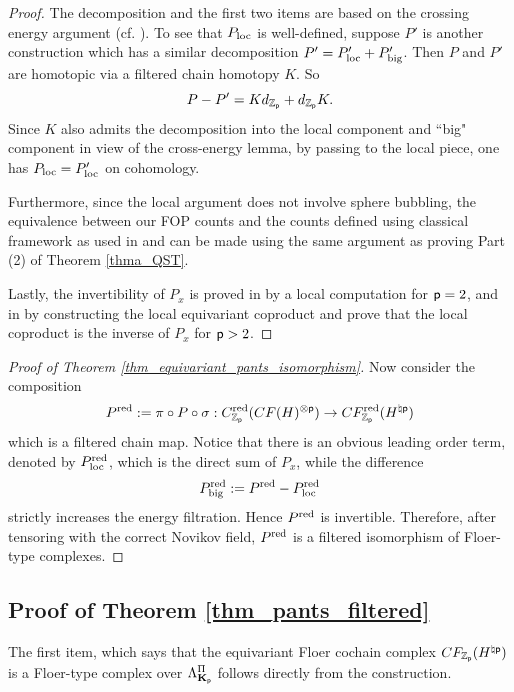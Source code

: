 \documentclass[reqno, 10pt]{amsart}
\numberwithin{equation}{section}
\numberwithin{equation}{section}
\theoremstyle{definition}
\theoremstyle{remark}
\newcommand{\beqn}{\begin{equation*}}
\newcommand{\eeqn}{\end{equation*}}
\newcommand{\mb}{\mathbb}
\newcommand{\p}{{\sf p}}
\newcommand{\kp}{{\bf K}_{\sf p}}
\newcommand{\zp}{{{\mb Z}_{\sf p}}}
\begin{document}
\begin{proof}
The decomposition and the first two items are based on the crossing energy argument (cf. \cite[Lemma B.1]{BSWX}). To see that $P_{\rm loc}$ is well-defined, suppose $P'$ is another construction which has a similar decomposition $P' = P_{\rm loc}' + P_{\rm big}'$. Then $P$ and $P'$ are homotopic via a filtered chain homotopy $K$. So 
\beqn
P - P' = K d_{\zp} + d_{\zp} K.
\eeqn
Since $K$ also admits the decomposition into the local component and ``big" component in view of the cross-energy lemma, by passing to the local piece, one has $P_{\rm loc} = P_{\rm loc}'$ on cohomology. 

Furthermore, since the local argument does not involve sphere bubbling, the equivalence between our FOP counts and the counts defined using classical framework as used in \cite{Seidel_pants} and \cite{shelukhin-zhao} can be made using the same argument as proving Part (2) of Theorem \ref{thma_QST}.

Lastly, the invertibility of $P_x$ is proved in \cite{Seidel_pants} by a local computation for $\p = 2$, and in \cite{shelukhin-zhao} by constructing the local equivariant coproduct and prove that the local coproduct is the inverse of $P_x$ for $\p > 2$.
\end{proof}


\begin{proof}[Proof of Theorem \ref{thm_equivariant_pants_isomorphism}]
Now consider the composition
\beqn
P^{\rm red}:= \pi \circ P \circ \sigma: C_{\zp}^{\rm red}(CF(H)^{\otimes \p}) \to CF_{\zp}^{\rm red}(H^{\natural \p})
\eeqn
which is a filtered chain map. Notice that there is an obvious leading order term, denoted by $P_{\rm loc}^{\rm red}$, which is the direct sum of $P_x$, while the difference
\beqn
P_{\rm big}^{\rm red}:= P^{\rm red} - P_{\rm loc}^{\rm red}
\eeqn
strictly increases the energy filtration. Hence $P^{\rm red}$ is invertible. Therefore, after tensoring with the correct Novikov field, $P^{\rm red}$ is a filtered isomorphism of Floer-type complexes.
\end{proof}

\subsection{Proof of Theorem \ref{thm_pants_filtered}}\label{subsec:thm-M}

The first item, which says that the equivariant Floer cochain complex $CF_{\zp}(H^{\natural \p})$ is a Floer-type complex over $\Lambda_{\kp}^\Pi$ follows directly from the construction.
\end{document}
